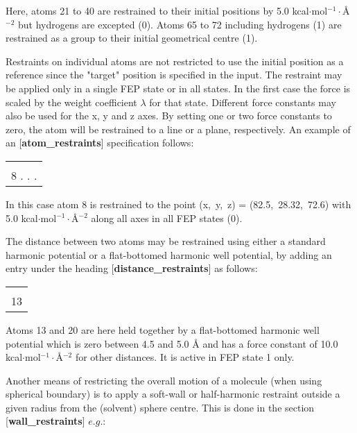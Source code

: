 \documentclass[a4paper,10pt]{article}
\begin{document}
Here, atoms 21 to 40 are restrained to their initial positions by
5.0 kcal$\cdot $mol$^{-1}\cdot ${\AA}$^{-2}$ but hydrogens are
excepted (0). Atoms 65 to 72 including hydrogens (1) are
restrained as a group to their initial geometrical centre (1).

Restraints on individual atoms are not restricted to use the
initial position as a reference since the "target" position is
specified in the input. The restraint may be applied only in a
single FEP state or in all states. In the first case the force is
scaled by the weight coefficient $\lambda $ for that state.
Different force constants may also be used for the x, y and z
axes. By setting one or two force constants to zero, the atom will
be restrained to a line or a plane, respectively. An example of an
[\textbf{atom{\_}restraints}] specification follows:

\begin{center}
\begin{tabularx}{\textwidth}{|X|}
  \hline
  [atom{\_}restraints] \\
  8 \; 82.5 \; 28.32 \; 72.6 \; 5. \; 5. \; 5. \; 0 \\ \hline
\end{tabularx}
\end{center}

In this case atom 8 is restrained to the point (x,~y,~z) =
(82.5,~28.32,~72.6) with 5.0 kcal$\cdot $mol$^{-1}\cdot
${\AA}$^{-2}$ along all axes in all FEP states (0).

The distance between two atoms may be restrained using either a
standard harmonic potential or a flat-bottomed harmonic well
potential, by adding an entry under the heading
[\textbf{distance{\_}restraints}] as follows:

\begin{center}
\begin{tabularx}{\textwidth}{|X|}
  \hline
  [distance{\_}restraints] \\
  13 \; 20 \; 4.5 \; 5.0 \; 10.0 \; 1 \\ \hline
\end{tabularx}
\end{center}

Atoms 13 and 20 are here held together by a flat-bottomed harmonic
well potential which is zero between 4.5 and 5.0 {\AA} and has a
force constant of 10.0 kcal$\cdot $mol$^{-1}\cdot ${\AA}$^{-2}$
for other distances. It is active in FEP state 1 only.

Another means of restricting the overall motion of a molecule
(when using spherical boundary) is to apply a soft-wall or
half-harmonic restraint outside a given radius from the (solvent)
sphere centre. This is done in the section
[\textbf{wall{\_}restraints}] $e.g.$:
\end{document}
